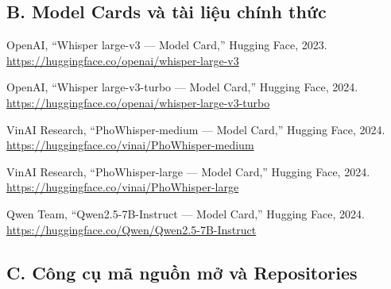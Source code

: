 \documentclass[12pt,a4paper]{article}
\begin{document}
\subsection*{B. Model Cards và tài liệu chính thức}

\begin{enumerate}[label={[B\arabic*]}]

\item OpenAI, ``Whisper large-v3 --- Model Card,''
Hugging Face, 2023.\\
\url{https://huggingface.co/openai/whisper-large-v3}

\item OpenAI, ``Whisper large-v3-turbo --- Model Card,''
Hugging Face, 2024.\\
\url{https://huggingface.co/openai/whisper-large-v3-turbo}

\item VinAI Research, ``PhoWhisper-medium --- Model Card,''
Hugging Face, 2024.\\
\url{https://huggingface.co/vinai/PhoWhisper-medium}

\item VinAI Research, ``PhoWhisper-large --- Model Card,''
Hugging Face, 2024.\\
\url{https://huggingface.co/vinai/PhoWhisper-large}

\item Qwen Team, ``Qwen2.5-7B-Instruct --- Model Card,''
Hugging Face, 2024.\\
\url{https://huggingface.co/Qwen/Qwen2.5-7B-Instruct}

\end{enumerate}

\subsection*{C. Công cụ mã nguồn mở và Repositories}
\end{document}

